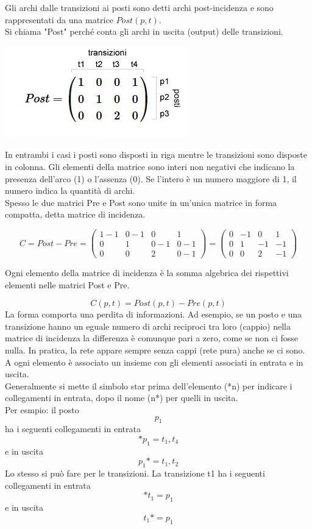 \documentclass{article}
\begin{document}
Gli archi dalle transizioni ai posti sono detti archi post-incidenza e sono rappresentati da una matrice $Post(p,t)$. \\
Si chiama "Post" perché conta gli archi in uscita (output) delle transizioni.
\begin{center}
    \includegraphics{imgGrafi/matrice-post-incidenza-esempio.png}
\end{center}
In entrambi i casi i posti sono disposti in riga mentre le transizioni sono disposte in colonna. Gli elementi della matrice sono interi non negativi che indicano la presenza dell'arco (1) o l'assenza (0). Se l'intero è un numero maggiore di 1, il numero indica la quantità di archi.\\

Spesso le due matrici Pre e Post sono unite in un'unica matrice in forma compatta, detta matrice di incidenza.

\[
C=Post-Pre = \begin{pmatrix} 1-1 & 0-1 & 0 & 1 \\ 0 & 1 & 0-1 & 0-1 \\ 0 & 0 & 2 & 0-1 \end{pmatrix} = \begin{pmatrix} 0 & -1 & 0 & 1 \\ 0 & 1 & -1 & -1 \\ 0 & 0 & 2 & -1 \end{pmatrix}
\]

Ogni elemento della matrice di incidenza è la somma algebrica dei rispettivi elementi nelle matrici Post e Pre.

\[
C(p,t)=Post(p,t)-Pre(p,t)
\]
La forma comporta una perdita di informazioni. Ad esempio, se un posto e una transizione hanno un eguale numero di archi reciproci tra loro (cappio) nella matrice di incidenza la differenza è comunque pari a zero, come se non ci fosse nulla. In pratica, la rete appare sempre senza cappi (rete pura) anche se ci sono.\\
A ogni elemento è associato un insieme con gli elementi associati in entrata e in uscita.\\
Generalmente si mette il simbolo star prima dell'elemento (*n) per indicare i collegamenti in entrata, dopo il nome (n*) per quelli in uscita.\\
Per esmpio: il posto
\[p_1\]
ha i seguenti collegamenti in entrata
\[*p_1={t_1,t_4}\]
e in uscita
\[p_1*={t_1,t_2}\]
Lo stesso si può fare per le transizioni. La transizione t1 ha i seguenti collegamenti in entrata
\[*t_1={p_1}\]
e in uscita
\[t_1*={p_1}\]
\end{document}
